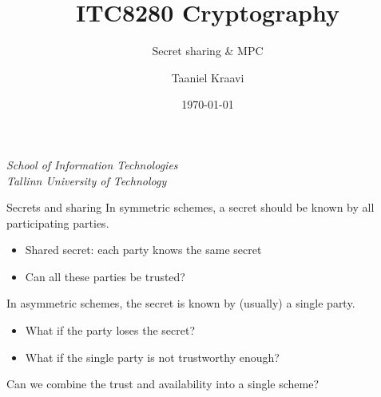 \usepackage{pgfplots}
\usetikzlibrary{positioning,calc}
\graphicspath{ {../../images/} }

\title{ITC8280 Cryptography}
\subtitle{Secret sharing \& MPC}
\date{\today}
\author{Taaniel Kraavi}
\institute%
{%
  \textit{School of Information Technologies}\\
  \textit{Tallinn University of Technology}
}


\begin{frame}
  \titlepage
\end{frame}

\begin{frame}{Secrets and sharing}
  In symmetric schemes, a secret should be known by all participating parties.
  \begin{itemize}[<+(1)->]
    \item Shared secret: each party knows the same secret
    \item Can all these parties be trusted?
  \end{itemize}

  \vspace*{1em}

  \pause
  In asymmetric schemes, the secret is known by (usually) a single party.
  \begin{itemize}[<+(1)->]
    \item What if the party loses the secret?
    \item What if the single party is not trustworthy enough?
  \end{itemize}

  \vspace*{1em}

  \pause
  Can we combine the trust and availability into a single scheme?
\end{frame}

